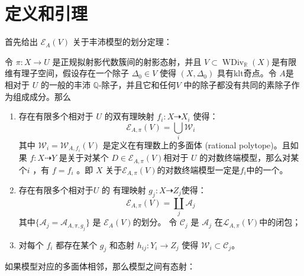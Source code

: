 \section{定义和引理}
首先给出 $\mathcal{E}_{A}(V)$ 关于丰沛模型的划分定理：
\begin{theorem}\label{finitemodel}
  \cite[Corollary 1.1.5]{BCHM10} 令 $\pi:X\to U$ 是正规拟射影代数簇间的射影态射，并且 $V \subset \operatorname{WDiv}_{\mathbb{R}}(X)$是有限维有理子空间，假设存在一个除子 $\Delta_{0} \in V$ 使得 $(X,\Delta_{0})$ 具有klt奇点。令 $A$是 相对于 $U$ 的一般的丰沛 $\mathbb{Q}$-除子，并且它和任何$V$ 中的除子都没有共同的素除子作为组成成分。那么
  \begin{enumerate}
    \item   存在有限多个相对于 $U$ 的双有理映射  $f_{i}:X \dashrightarrow   X_{i}$ 使得：
          \[ \mathcal{E}_{A,\pi}(V) =\bigcup_{i}\mathcal{W}_{i} \]
          其中  $\mathcal{W}_{i}=\mathcal{W}_{A,f_{i}}(V)$ 是定义在有理数上的多面体  (rational polytope)。且如果  $f:X \dashrightarrow  Y$ 是关于对某个 $D \in \mathcal{E}_{A,\pi}(V)$相对于 $U$ 的对数终端模型，那么对某个$i$ ，有  $f=f_{i}$ 。即 $X$ 关于$\mathcal{E}_{A,\pi}(V)$的对数终端模型一定是$f_{i}$中的一个。   
    \item   存在有限多个相对于$U$ 的 有理映射 $g_{j}:X \dashrightarrow  Z_{j}$使得： 
          \[ \mathcal{E}_{A,\pi}(V) =\coprod_{j}\mathcal{A}_{j} \]
          其中$ \{\mathcal{A}_j=\mathcal{A}_{A,\pi,g_j}\} $ 是 $ \mathcal{E}_{A}(V) $的划分。 令 $\mathcal{C}_{j}$ 是 $\mathcal{A}_{j}$ 在$\mathcal{L}_{A,\pi}(V)$中的闭包；
    \item  对每个  $f_{i}$ 都存在某个 $g_{j}$ 和态射 $h_{ij}:Y_{i}\to Z_{j}$ 使得 $\mathcal{W}_{i} \subset \mathcal{C}_{j}$。
  \end{enumerate}
\end{theorem}
如果模型对应的多面体相邻，那么模型之间有态射：
